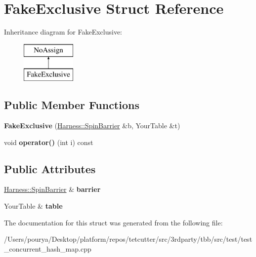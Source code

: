 \hypertarget{structFakeExclusive}{}\section{Fake\+Exclusive Struct Reference}
\label{structFakeExclusive}
Inheritance diagram for Fake\+Exclusive\+:\begin{figure}[H]
\begin{center}
\leavevmode
\includegraphics[height=2.000000cm]{structFakeExclusive}
\end{center}
\end{figure}
\subsection*{Public Member Functions}
\begin{DoxyCompactItemize}
\item 
\hypertarget{structFakeExclusive_a7a1d90a1ec44eab612458cba0967e99a}{}{\bfseries Fake\+Exclusive} (\hyperlink{classHarness_1_1SpinBarrier}{Harness\+::\+Spin\+Barrier} \&b, Your\+Table \&t)\label{structFakeExclusive_a7a1d90a1ec44eab612458cba0967e99a}

\item 
\hypertarget{structFakeExclusive_a07d778af17457de848c6fc47ba4220fd}{}void {\bfseries operator()} (int i) const \label{structFakeExclusive_a07d778af17457de848c6fc47ba4220fd}

\end{DoxyCompactItemize}
\subsection*{Public Attributes}
\begin{DoxyCompactItemize}
\item 
\hypertarget{structFakeExclusive_ad4f17c3ad1631d62504bf148007ad5c5}{}\hyperlink{classHarness_1_1SpinBarrier}{Harness\+::\+Spin\+Barrier} \& {\bfseries barrier}\label{structFakeExclusive_ad4f17c3ad1631d62504bf148007ad5c5}

\item 
\hypertarget{structFakeExclusive_a7fe85cd870b1c8759b06c843b6158da0}{}Your\+Table \& {\bfseries table}\label{structFakeExclusive_a7fe85cd870b1c8759b06c843b6158da0}

\end{DoxyCompactItemize}


The documentation for this struct was generated from the following file\+:\begin{DoxyCompactItemize}
\item 
/\+Users/pourya/\+Desktop/platform/repos/tetcutter/src/3rdparty/tbb/src/test/test\+\_\+concurrent\+\_\+hash\+\_\+map.\+cpp\end{DoxyCompactItemize}
